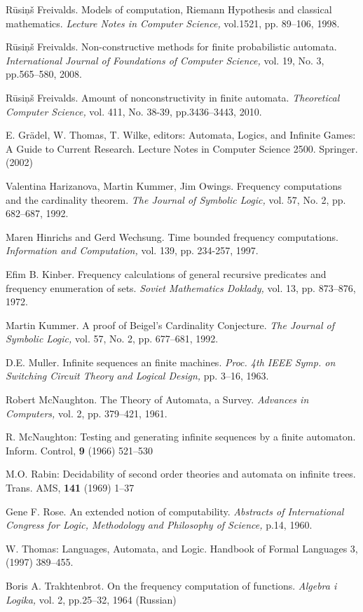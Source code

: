 \documentclass{llncs}
\begin{document}
\begin{thebibliography}{99}
R\= usi\c n\v s Freivalds.
Models of computation, Riemann Hypothesis and classical mathematics.
{\em Lecture Notes in Computer Science,} vol.1521, pp. 89--106, 1998.

R\= usi\c n\v s Freivalds.
Non-constructive methods for finite probabilistic automata.
{\em International Journal of Foundations of Computer Science,} vol. 19, No. 3, pp.565--580, 2008.

R\= usi\c n\v s Freivalds.
Amount of nonconstructivity in finite automata. 
{\em Theoretical Computer Science,} vol. 411, No. 38-39, pp.3436--3443, 2010.

\fi

E. Gr\"adel, W. Thomas, T. Wilke, editors: 
Automata, Logics, and Infinite Games: A Guide to Current Research.
Lecture Notes in Computer Science 2500. Springer. (2002)
%


Valentina Harizanova, Martin Kummer, Jim Owings.
Frequency computations and the cardinality theorem.
{\em The Journal of Symbolic Logic,} vol. 57, No. 2, pp. 682--687, 1992.

Maren Hinrichs and Gerd Wechsung.
Time bounded frequency computations.
{\em Information and Computation,} vol. 139, pp. 234-257, 1997.



Efim B. Kinber.
Frequency calculations of general recursive predicates and frequency
enumeration of sets.
{\em Soviet Mathematics Doklady,} vol. 13, pp. 873--876, 1972.


Martin Kummer.
A proof of Beigel's Cardinality Conjecture. 
{\em The Journal of Symbolic Logic,} vol. 57, No. 2, pp. 677--681, 1992.

D.E. Muller. 
Infinite sequences an finite machines.
{\em Proc. 4th IEEE Symp. on Switching Circuit Theory and Logical Design,} pp. 3--16, 1963.

Robert McNaughton.
The Theory of Automata, a Survey.
{\em Advances in Computers,} vol. 2, pp. 379--421, 1961.

R. McNaughton: 
Testing and generating infinite sequences by a finite automaton.
Inform. Control, {\bf 9} (1966) 521--530
%

M.O. Rabin: 
Decidability of second order theories and automata on infinite trees.
Trans. AMS, {\bf 141} (1969) 1--37
%

Gene F. Rose.
An extended notion of computability.
{\em Abstracts of International Congress for Logic, Methodology and Philosophy of Science,} p.14, 1960.

W. Thomas: 
Languages, Automata, and Logic. 
Handbook of Formal Languages 3, (1997) 389--455.

Boris A. Trakhtenbrot.
On the frequency computation of functions.
{\em Algebra i Logika,} vol. 2, pp.25--32, 1964 (Russian)


\end{thebibliography}
\end{document}
